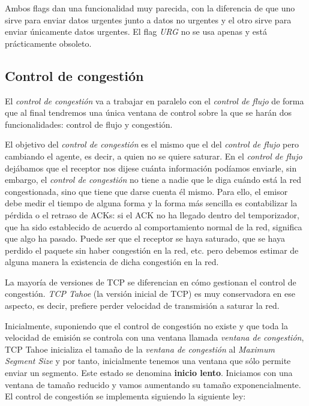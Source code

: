 \documentclass[10pt,a4paper,spanish]{report}
\begin{document}
Ambos flags dan una funcionalidad muy parecida, con la diferencia de que uno sirve para enviar datos urgentes junto a datos no urgentes y el otro sirve para enviar únicamente datos urgentes. El flag \textit{\textcolor{tema3}{URG}} no se usa apenas y está prácticamente obsoleto.

\subsection{\textcolor{tema3}Control de congestión}
El \textit{\textcolor{tema3}{control de congestión}} va a trabajar en paralelo con el \textit{\textcolor{tema3}{control de flujo}} de forma que al final tendremos una única ventana de control sobre la que se harán dos funcionalidades: control de flujo y congestión. 

El objetivo del \textit{\textcolor{tema3}{control de congestión}} es el mismo que el del \textit{\textcolor{tema3}{control de flujo}} pero cambiando el agente, es decir, a quien no se quiere saturar. En el \textit{\textcolor{tema3}{control de flujo}} dejábamos que el receptor nos dijese cuánta información podíamos enviarle, sin embargo, el \textit{\textcolor{tema3}{control de congestión}} no tiene a nadie que le diga cuándo está la red congestionada, sino que tiene que darse cuenta él mismo. Para ello, el emisor debe medir el tiempo de alguna forma y la forma más sencilla es contabilizar la pérdida o el retraso de ACKs: si el ACK no ha llegado dentro del temporizador, que ha sido establecido de acuerdo al comportamiento normal de la red, significa que algo ha pasado. Puede ser que el receptor se haya saturado, que se haya perdido el paquete sin haber congestión en la red, etc. pero debemos estimar de alguna manera la existencia de dicha congestión en la red.

La mayoría de versiones de TCP se diferencian en cómo gestionan el control de congestión. \textit{\textcolor{tema3}{TCP Tahoe}} (la versión inicial de TCP) es muy conservadora en ese aspecto, es decir, prefiere perder velocidad de transmisión a saturar la red. 

Inicialmente, suponiendo que el control de congestión no existe y que toda la velocidad de emisión se controla con una ventana llamada \textit{\textcolor{tema3}{ventana de congestión}}, TCP Tahoe inicializa el tamaño de la \textit{\textcolor{tema3}{ventana de congestión}} al \textit{\textcolor{tema3}{Maximum Segment Size}} y por tanto, inicialmente tenemos una ventana que sólo permite enviar un segmento. Este estado se denomina \textbf{\textcolor{tema3}{inicio lento}}. Iniciamos con una ventana de tamaño reducido y vamos aumentando su tamaño exponencialmente. El control de congestión se implementa siguiendo la siguiente ley:
\end{document}
